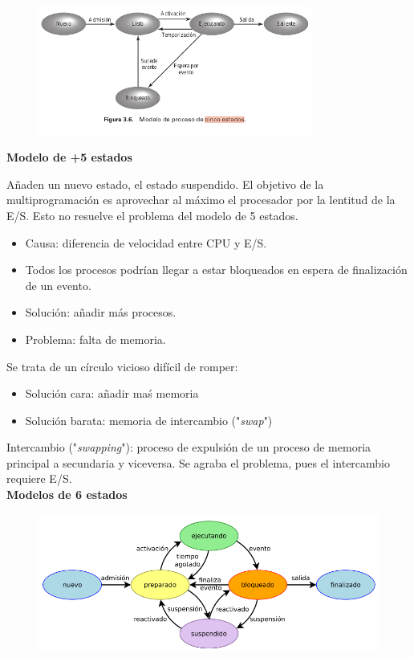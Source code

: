 \documentclass{article}
\begin{document}
\begin{figure}[h]
\centering
\includegraphics[scale=1,width=90mm]{cinco_estados.png}
\end{figure}

\textbf{Modelo de +5 estados}

Añaden un nuevo estado, el estado suspendido. El objetivo de la multiprogramación es aprovechar al máximo el procesador por la lentitud de la E/S. Esto no resuelve el problema del modelo de 5 estados.
\begin{itemize}
\item Causa: diferencia de velocidad entre CPU y E/S.

\item Todos los procesos podrían llegar a estar bloqueados en espera de finalización de un evento.

\item Solución: añadir más procesos.

\item Problema: falta de memoria.
\end{itemize}

Se trata de un círculo vicioso difícil de romper:
\begin{itemize}
\item Solución cara: añadir maś memoria

\item Solución barata: memoria de intercambio ("\textit{swap}")
\end{itemize}

Intercambio ("\textit{swapping}"): proceso de expulsión de un proceso de memoria principal a secundaria y viceversa. Se agraba el problema, pues el intercambio requiere E/S.\\

\textbf{Modelos de 6 estados}
\begin{figure}[h]
\centering
\includegraphics[scale=1,width=\textwidth]{6_estados.png}
\end{figure}
\end{document}
